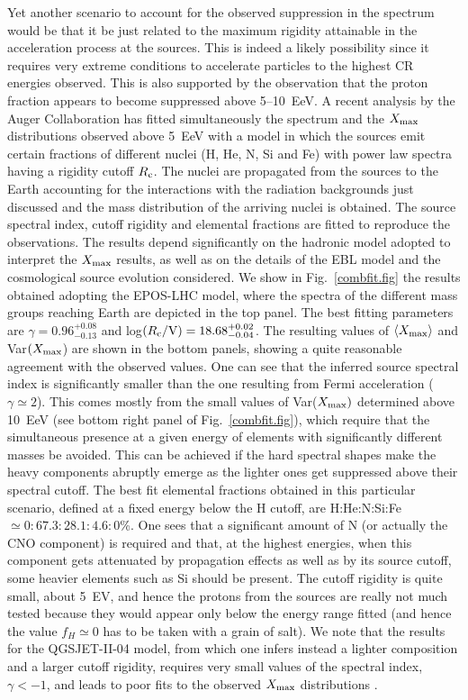 \documentclass[twoside,12pt]{article}
\begin{document}
Yet another scenario to account for the observed suppression in the spectrum would be that it be just related to the maximum rigidity attainable in the acceleration process at the sources. This is indeed a likely possibility  since it requires very extreme conditions to accelerate particles to the highest CR energies observed. This is also supported by the observation that the proton fraction appears to become suppressed above 5--10~EeV.  
A recent analysis by the Auger Collaboration \cite{combfit} has fitted simultaneously the spectrum and the $X_{\rm max}$ distributions observed above 5~EeV with a model in which the sources  emit certain fractions  of different nuclei (H, He, N, Si and Fe) with power law spectra having a rigidity cutoff $R_{\rm c}$. The nuclei are propagated from the sources to the Earth accounting for the interactions with the radiation backgrounds just discussed and the mass distribution of the arriving nuclei is obtained. The source spectral index, cutoff rigidity and elemental fractions are fitted to reproduce the observations. The results depend significantly on the hadronic model adopted to interpret the $X_{\rm max}$ results, as well as on the details of the EBL model and the cosmological source evolution considered. We show in Fig.~\ref{combfit.fig} the results obtained adopting the EPOS-LHC model, where the spectra of the different mass groups reaching Earth are depicted in the top panel. The best fitting parameters are $\gamma=0.96^{+0.08}_{-0.13}$ and log$(R_{\rm c}/{\rm V})=18.68^{+0.02}_{-0.04}$. The resulting values of $\langle X_{\rm max}\rangle$ and Var$(X_{\rm max}$)  are shown in the bottom panels, showing a quite reasonable agreement with the observed values. One can see that the inferred source spectral index is significantly smaller than the one resulting from Fermi acceleration ($\gamma\simeq 2$).  This comes mostly from the small values of Var($X_{\rm max})$ determined above 10~EeV (see bottom right panel of Fig.~\ref{combfit.fig}), which require that the simultaneous presence at a given energy of elements with significantly different masses be avoided. This can be achieved if the hard spectral shapes make the heavy components abruptly emerge as the lighter ones get suppressed above their spectral cutoff. The best fit elemental fractions obtained in this particular scenario, defined at a fixed energy below the H cutoff,  are H:He:N:Si:Fe${}\simeq 0:67.3:28.1:4.6:0$\%. One sees that a significant amount of N (or actually the CNO component) is required and that, at the highest energies, when this component gets attenuated by propagation effects as well as by its source cutoff, some heavier elements such as Si should be present. The cutoff rigidity is quite small,  about 5~EV, and hence the protons from the sources are really not much tested  because they would appear only below the energy range fitted (and hence the value $f_H\simeq 0$ has to be taken with a grain of salt). 
We note that the results for the QGSJET-II-04 model, from which one infers instead a lighter composition and a larger cutoff rigidity, requires very small values of the spectral index, $\gamma<-1$, and leads to poor fits to the observed $X_{\rm max}$ distributions \cite{combfit}.
\end{document}
